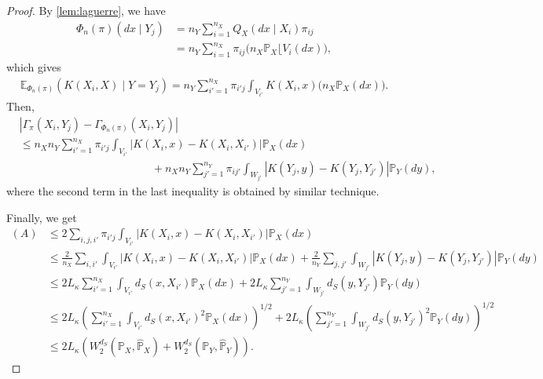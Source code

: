\documentclass{article}
\begin{document}
\begin{proof}
	By \cref{lem:laguerre}, we have
	\begin{align*}
		\Phi_n(\pi)(dx \mid Y_j) &= n_Y \sum_{i=1}^{n_X} Q_X(dx \mid X_i) \pi_{ij} \\
						         &= n_Y \sum_{i=1}^{n_X} \pi_{ij} \Big(n_X \mathbb{P}_X \lfloor V_i (dx)\Big) ,
	\end{align*}
	which gives
	\begin{align*}
		\mathbb{E}_{\Phi_n(\pi)}(K(X_i,X) \mid Y=Y_j) = n_Y \sum_{i' = 1}^{n_X} \pi_{i'j} \int_{V_{i'}} K(X_i,x) \Big(n_X \mathbb{P}_X(dx)\Big) .
	\end{align*}
	Then,
	\begin{align*}
		&\left\vert \Gamma_{\pi}(X_i,Y_j) - \Gamma_{\Phi_n(\pi)}(X_i,Y_j) \right\vert \\
		&\leq n_Xn_Y \sum_{i' = 1}^{n_X} \pi_{i'j} \int_{V_{i'}} \left\vert K(X_i,x) - K(X_i,X_{i'}) \right\vert \mathbb{P}_X(dx) \\
		&\qquad\qquad\qquad\qquad\qquad\qquad + n_Xn_Y \sum_{j' = 1}^{n_Y} \pi_{ij'} \int_{W_{j'}} \left\vert K(Y_j,y) - K(Y_j,Y_{j'}) \right\vert \mathbb{P}_Y(dy) ,
	\end{align*}
	where the second term in the last inequality is obtained by similar technique.
	
	Finally, we get
	\begin{align*}
		(A) &\leq 2 \sum_{i,j,i'} \pi_{i'j} \int_{V_{i'}} \left\vert K(X_i,x) - K(X_i,X_{i'}) \right\vert \mathbb{P}_X(dx) \\
			&\leq \frac{2}{n_X} \sum_{i,i'} \int_{V_{i'}} \left\vert K(X_i,x) - K(X_i,X_{i'}) \right\vert \mathbb{P}_X(dx) + \frac{2}{n_Y} \sum_{j,j'} \int_{W_{j'}} \left\vert K(Y_j,y) - K(Y_j,Y_{j'}) \right\vert \mathbb{P}_Y(dy) \\
			&\leq 2L_{\kappa} \sum_{i' = 1}^{n_X} \int_{V_{i'}} d_S(x,X_{i'}) \mathbb{P}_X(dx) + 2L_{\kappa} \sum_{j' = 1}^{n_Y} \int_{W_{j'}} d_S(y,Y_{j'}) \mathbb{P}_Y(dy) \\
			&\leq 2L_{\kappa} \left(\sum_{i' = 1}^{n_X} \int_{V_{i'}} d_S(x,X_{i'})^2 \mathbb{P}_X(dx)\right)^{1/2} + 2L_{\kappa} \left(\sum_{j' = 1}^{n_Y} \int_{W_{j'}} d_S(y,Y_{j'})^2 \mathbb{P}_Y(dy)\right)^{1/2} \\
			&\leq 2L_{\kappa} \left(W_2^{d_S}(\mathbb{P}_X,\hat{\mathbb{P}}_X) + W_2^{d_S}(\mathbb{P}_Y,\hat{\mathbb{P}}_Y)\right) .
	\end{align*}
	

\end{proof}
\end{document}
